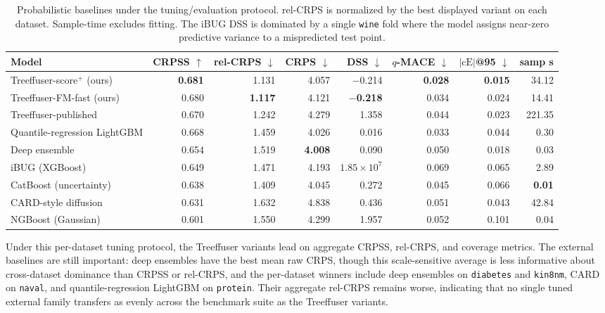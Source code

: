 \documentclass{tpm2026}
\begin{document}
\begin{table}[!h]
  \centering
  \caption{Probabilistic baselines under the tuning/evaluation protocol. rel-CRPS is normalized by the best displayed variant on each dataset. Sample-time excludes fitting. The iBUG DSS is dominated by a single \texttt{wine} fold where the model assigns near-zero predictive variance to a mispredicted test point.}\label{tab:competitors}
  \scriptsize
  \begin{tabular}{lrrrrrrr}
    \toprule
    Model & CRPSS $\uparrow$ & rel-CRPS $\downarrow$ & CRPS $\downarrow$ & DSS $\downarrow$ & $q$-MACE $\downarrow$ & $|\text{cE}|$@95 $\downarrow$ & samp s \\
    \midrule
    Treeffuser-score$^+$ (ours)     & \textbf{0.681} & 1.131 & 4.057 & $-$0.214 & \textbf{0.028} & \textbf{0.015} & 34.12 \\
    Treeffuser-FM-fast (ours)       & 0.680 & \textbf{1.117} & 4.121 & \textbf{$-$0.218} & 0.034 & 0.024 & 14.41 \\
    Treeffuser-published            & 0.670 & 1.242 & 4.279 & 1.358 & 0.044 & 0.023 & 221.35 \\
    Quantile-regression LightGBM    & 0.668 & 1.459 & 4.026 & 0.016 & 0.033 & 0.044 & 0.30 \\
    Deep ensemble                   & 0.654 & 1.519 & \textbf{4.008} & 0.090 & 0.050 & 0.018 & 0.03 \\
    iBUG (XGBoost)                  & 0.649 & 1.471 & 4.193 & $1.85{\times}10^7$ & 0.069 & 0.065 & 2.89 \\
    CatBoost (uncertainty)          & 0.638 & 1.409 & 4.045 & 0.272 & 0.045 & 0.066 & \textbf{0.01} \\
    CARD-style diffusion            & 0.631 & 1.632 & 4.838 & 0.436 & 0.051 & 0.043 & 42.84 \\
    NGBoost (Gaussian)              & 0.601 & 1.550 & 4.299 & 1.957 & 0.052 & 0.101 & 0.04 \\
    \bottomrule
  \end{tabular}
\end{table}

Under this per-dataset tuning protocol, the Treeffuser variants lead on aggregate CRPSS, rel-CRPS, and coverage metrics. The external baselines are still important: deep ensembles have the best mean raw CRPS, though this scale-sensitive average is less informative about cross-dataset dominance than CRPSS or rel-CRPS, and the per-dataset winners include deep ensembles on \texttt{diabetes} and \texttt{kin8nm}, CARD on \texttt{naval}, and quantile-regression LightGBM on \texttt{protein}. Their aggregate rel-CRPS remains worse, indicating that no single tuned external family transfers as evenly across the benchmark suite as the Treeffuser variants.
\end{document}

